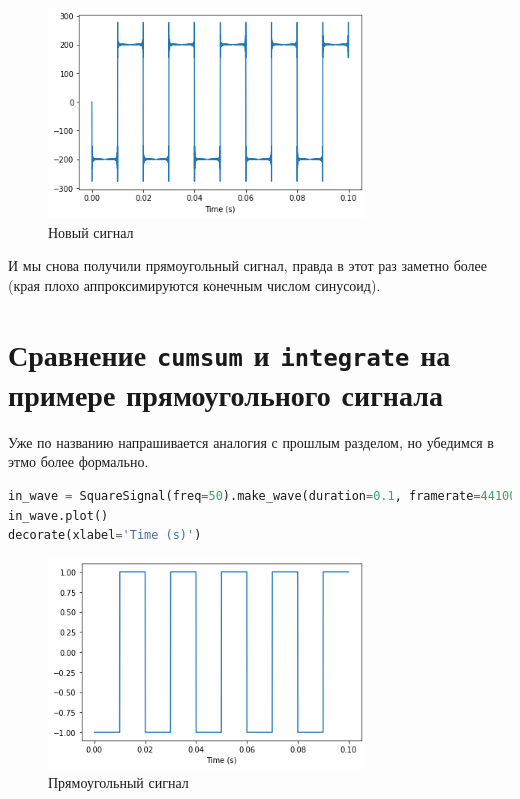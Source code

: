 \documentclass[a4paper,12pt]{report}
\begin{document}
    \begin{figure}[H]
        \centering
        \includegraphics[width=0.75\textwidth]{ex1_out_wave2.png}
        \caption{Новый сигнал}
        \label{fig:ex1_out_wave2}
    \end{figure}

    И мы снова получили прямоугольный сигнал, правда в этот раз заметно более  (края плохо аппроксимируются конечным числом синусоид).
    
    \chapter{Сравнение \texttt{cumsum} и \texttt{integrate} на примере прямоугольного сигнала}
    
    Уже по названию напрашивается аналогия с прошлым разделом, но убедимся в этмо более формально.
    
\begin{lstlisting}[language=Python,caption=Прямоугольный сигнал]
in_wave = SquareSignal(freq=50).make_wave(duration=0.1, framerate=44100)
in_wave.plot()
decorate(xlabel='Time (s)')
\end{lstlisting}

    \begin{figure}[H]
        \centering
        \includegraphics[width=0.75\textwidth]{ex2_in_wave.png}
        \caption{Прямоугольный сигнал}
        \label{fig:ex2_in_wave}
    \end{figure}
\end{document}
